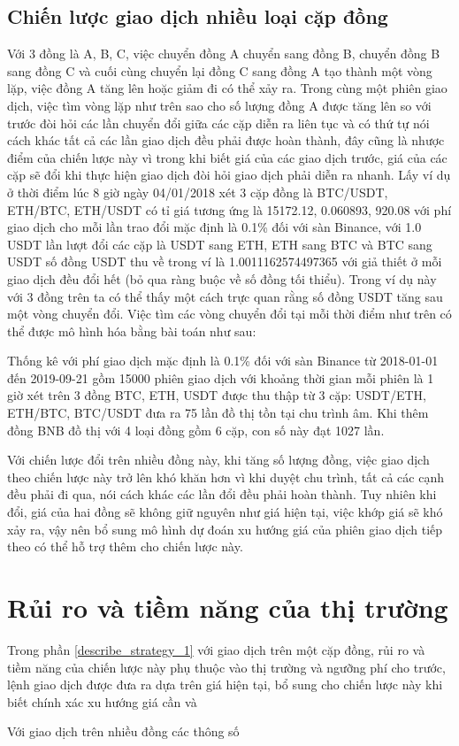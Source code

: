  \subsection{Chiến lược giao dịch nhiều loại cặp đồng}
  Với 3 đồng là A, B, C, việc chuyển đồng A chuyển sang đồng B, chuyển đồng B sang đồng C và cuối cùng chuyển lại đồng C sang đồng A tạo thành một vòng lặp, việc đồng A tăng lên hoặc giảm đi có thể xảy ra. Trong cùng một phiên giao dịch, việc tìm vòng lặp như trên sao cho số lượng đồng A được tăng lên so với trước đòi hỏi các lần chuyển đổi giữa các cặp diễn ra liên tục và có thứ tự nói cách khác tất cả các lần giao dịch đều phải được hoàn thành, đây cũng là nhược điểm của chiến lược này vì trong khi biết giá của các giao dịch trước, giá của các cặp sẽ đổi khi thực hiện giao dịch đòi hỏi giao dịch phải diễn ra nhanh.
  Lấy ví dụ ở thời điểm lúc 8 giờ ngày 04/01/2018 xét 3 cặp đồng là BTC/USDT, ETH/BTC, ETH/USDT có tỉ giá tương ứng là 15172.12, 0.060893, 920.08 với phí giao dịch cho mỗi lần trao đổi mặc định là 0.1\% đối với sàn Binance, với 1.0 USDT lần lượt đổi các cặp là USDT sang ETH, ETH sang BTC và BTC sang USDT số đồng USDT thu về trong ví là 1.0011162574497365 với giả thiết ở mỗi giao dịch đều đổi hết (bỏ qua ràng buộc về số đồng tối thiểu). Trong ví dụ này với 3 đồng trên ta có thể thấy một cách trực quan rằng số đồng USDT tăng sau một vòng chuyển đổi. Việc tìm các vòng chuyển đổi tại mỗi thời điểm như trên có thể  được mô hình hóa bằng bài toán như sau:
  
  Thống kê với phí giao dịch mặc định là 0.1\% đối với sàn Binance từ 2018-01-01 đến 2019-09-21 gồm 15000 phiên giao dịch với khoảng thời gian mỗi phiên là 1 giờ xét trên 3 đồng BTC, ETH, USDT được thu thập từ 3 cặp: USDT/ETH, ETH/BTC, BTC/USDT đưa ra 75 lần đồ thị tồn tại chu trình âm. Khi thêm đồng BNB đồ thị với 4 loại đồng gồm 6 cặp, con số này đạt 1027 lần.
  
  Với chiến lược đổi trên nhiều đồng này, khi tăng số lượng đồng, việc giao dịch theo chiến lược này trở lên khó khăn hơn vì khi duyệt chu trình, tất cả các cạnh đều phải đi qua, nói cách khác các lần đổi đều phải hoàn thành. Tuy nhiên khi đổi, giá của hai đồng sẽ không giữ nguyên như giá hiện tại, việc khớp giá sẽ khó xảy ra, vậy nên bổ sung mô hình dự đoán xu hướng giá của phiên giao dịch tiếp theo có thể hỗ trợ thêm cho chiến lược này.
  
  \section{Rủi ro và tiềm năng của thị trường}
  
  Trong phần \ref{describe_strategy_1} với giao dịch trên một cặp đồng, rủi ro và tiềm năng của chiến lược này phụ thuộc vào thị trường và ngưỡng phí cho trước, lệnh giao dịch được đưa ra dựa trên giá hiện tại, bổ sung cho chiến lược này khi biết chính xác xu hướng giá cần và
  

Với giao dịch trên nhiều đồng các thông số


